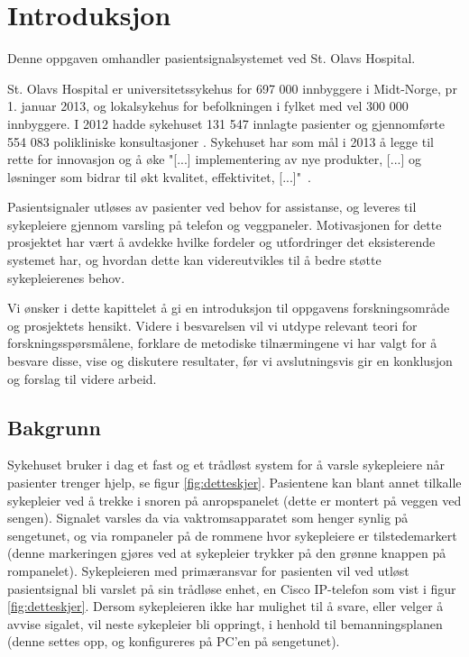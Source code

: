 \chapter{Introduksjon}
\label{chp:introduksjon}
Denne oppgaven omhandler pasientsignalsystemet ved St. Olavs Hospital.

\noindent
St. Olavs Hospital er universitetssykehus for 697 000 innbyggere i Midt-Norge, pr 1. januar 2013, og lokalsykehus for befolkningen i fylket med vel 300 000 innbyggere. I 2012 hadde sykehuset 131 547 innlagte pasienter og gjennomførte 554 083 polikliniske konsultasjoner \cite{stolavs}. Sykehuset har som mål i 2013 å legge til rette for innovasjon og å øke "[...] implementering av nye produkter, [...] og løsninger som bidrar til økt kvalitet, effektivitet, [...]"\ \cite{styring13}.

\noindent
Pasientsignaler utløses av pasienter ved behov for assistanse, og leveres til sykepleiere gjennom varsling på telefon og veggpaneler. Motivasjonen for dette prosjektet har vært å avdekke hvilke fordeler og utfordringer det eksisterende systemet har, og hvordan dette kan videreutvikles til å bedre støtte sykepleierenes behov.

\noindent
Vi ønsker i dette kapittelet å gi en introduksjon til oppgavens forskningsområde og prosjektets hensikt. Videre i besvarelsen vil vi utdype relevant teori for forskningsspørsmålene, forklare de metodiske tilnærmingene vi har valgt for å besvare disse, vise og diskutere resultater, før vi avslutningsvis gir en konklusjon og forslag til videre arbeid.

\section{Bakgrunn}
Sykehuset bruker i dag et fast og et trådløst system for å varsle sykepleiere når pasienter trenger hjelp, se figur \ref{fig:detteskjer}. Pasientene kan blant annet tilkalle sykepleier ved å trekke i snoren på anropspanelet (dette er montert på veggen ved sengen). Signalet varsles da via vaktromsapparatet som henger synlig på sengetunet, og via rompaneler på de rommene hvor sykepleiere er tilstedemarkert (denne markeringen gjøres ved at sykepleier trykker på den grønne knappen på rompanelet). 
Sykepleieren med primæransvar for pasienten vil ved utløst pasientsignal bli varslet på sin trådløse enhet, en Cisco IP-telefon som vist i figur \ref{fig:detteskjer}. Dersom sykepleieren ikke har mulighet til å svare, eller velger å avvise sigalet, vil neste sykepleier bli oppringt, i henhold til bemanningsplanen (denne settes opp, og konfigureres på PC'en på sengetunet).

